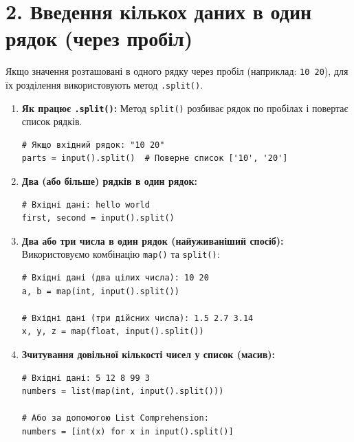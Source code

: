 \documentclass{scrreprt}
\begin{document}
	\vfill\newpage

	\section*{2. Введення кількох даних в один рядок (через пробіл)}
	
	Якщо значення розташовані в одного рядку через пробіл (наприклад: \texttt{10 20}), для їх розділення використовують метод \texttt{.split()}.
	
	\begin{enumerate}[label=\arabic*.]
		\item \textbf{Як працює \texttt{.split()}:}
		Метод \texttt{split()} розбиває рядок по пробілах і повертає список рядків.
\begin{verbatim}
# Якщо вхідний рядок: "10 20"
parts = input().split()  # Поверне список ['10', '20']
\end{verbatim}

		\item \textbf{Два (або більше) рядків в один рядок:}
\begin{verbatim}
# Вхідні дані: hello world
first, second = input().split()
\end{verbatim}

		\item \textbf{Два або три числа в один рядок (найуживаніший спосіб):}
		Використовуємо комбінацію \texttt{map()} та \texttt{split()}:
\begin{verbatim}
# Вхідні дані (два цілих числа): 10 20
a, b = map(int, input().split())

# Вхідні дані (три дійсних числа): 1.5 2.7 3.14
x, y, z = map(float, input().split())
\end{verbatim}

		\item \textbf{Зчитування довільної кількості чисел у список (масив):}
\begin{verbatim}
# Вхідні дані: 5 12 8 99 3
numbers = list(map(int, input().split()))

# Або за допомогою List Comprehension:
numbers = [int(x) for x in input().split()]
\end{verbatim}
	\end{enumerate}

	\vspace{0.5cm}
\end{document}
